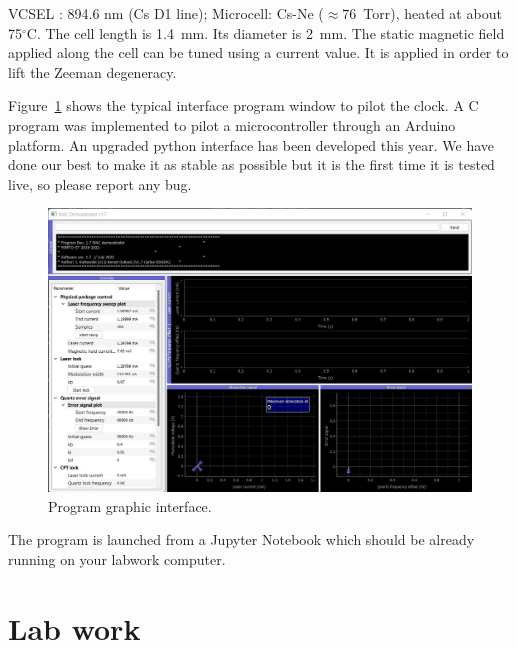 \documentclass[a4paper,11pt]{article}
\begin{document}
VCSEL : 894.6 nm (Cs D1 line);
Microcell: Cs-Ne ($\approx 76$~Torr), heated at about 75$^\circ$C. The cell length is 1.4~mm. Its diameter is 2~mm.
The static magnetic field applied along the cell can be tuned using a current value. It is applied in order to lift the Zeeman degeneracy. 

Figure~\ref{fig:gui} shows the typical interface program window to pilot the clock. A C program was implemented to pilot a microcontroller through an Arduino platform. An upgraded python interface has been developed this year. We have done our best to make it as stable as possible but it is the first time it is tested live, so please report any bug.%

\begin{figure}[h!]
	\centering
	\includegraphics[width=0.9\linewidth]{Images/gui_new.jpg}
	\caption{Program graphic interface.}
	\label{fig:gui}
\end{figure}

The program is launched from a Jupyter Notebook which should be already running on your labwork computer.


\section{Lab work}
\end{document}
